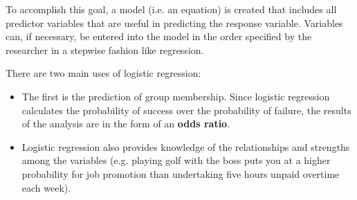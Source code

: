\documentclass[a4paper,12pt]{article}
\begin{document}
To accomplish this goal, a model (i.e. an equation) is created that includes all predictor variables that are useful in predicting the response variable. Variables can, if necessary, be entered into the model in the order specified by the researcher in a stepwise fashion like regression.

There are two main uses of logistic regression:
\begin{itemize}
	\item The first is the prediction of group membership. Since logistic regression calculates the
	probability of success over the probability of failure, the results of the analysis are in
	the form of an \textbf{odds ratio}.
	\item Logistic regression also provides knowledge of the relationships and strengths among
	the variables (e.g. playing golf with the boss puts you at a higher probability for job
	promotion than undertaking five hours unpaid overtime each week).
\end{itemize}
\end{document}
